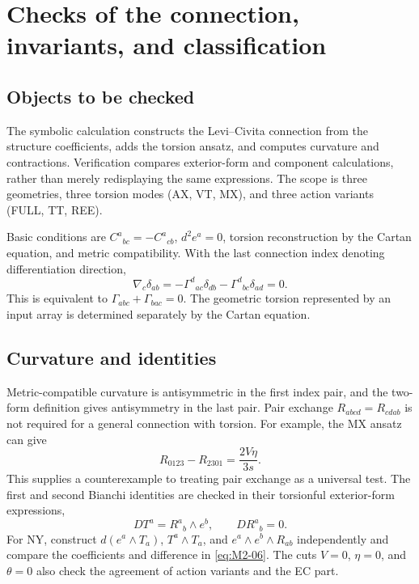 \section{Checks of the connection, invariants, and classification}\label{appB}
\subsection{Objects to be checked}
The symbolic calculation constructs the Levi--Civita connection from the
structure coefficients, adds the torsion ansatz, and computes curvature
and contractions. Verification compares exterior-form and component
calculations, rather than merely redisplaying the same expressions.
The scope is three geometries, three torsion modes (AX, VT, MX),
and three action variants (FULL, TT, REE).

Basic conditions are $C^a{}_{bc}=-C^a{}_{cb}$, $d^2e^a=0$,
torsion reconstruction by the Cartan equation, and metric compatibility.
With the last connection index denoting differentiation direction,
\begin{equation}
\nabla_c\delta_{ab}
=-\Gamma^d{}_{ac}\delta_{db}
-\Gamma^d{}_{bc}\delta_{ad}=0.
\tag{B-01}\label{eq:B-01}
\end{equation}
This is equivalent to $\Gamma_{abc}+\Gamma_{bac}=0$.
The geometric torsion represented by an input array is determined
separately by the Cartan equation.

\subsection{Curvature and identities}
Metric-compatible curvature is antisymmetric in the first index pair,
and the two-form definition gives antisymmetry in the last pair.
Pair exchange $R_{abcd}=R_{cdab}$ is not required for a general
connection with torsion. For example, the MX ansatz can give
\begin{equation}
R_{0123}-R_{2301}=\frac{2V\eta}{3s}.
\tag{B-02}\label{eq:B-02}
\end{equation}
This supplies a counterexample to treating pair exchange as a universal
test. The first and second Bianchi identities are checked in their
torsionful exterior-form expressions,
\begin{equation}
DT^a=R^a{}_b\wedge e^b,\qquad DR^a{}_b=0.
\tag{B-03}\label{eq:B-03}
\end{equation}
For NY, construct $d(e^a\wedge T_a)$, $T^a\wedge T_a$, and
$e^a\wedge e^b\wedge R_{ab}$ independently and compare the coefficients
and difference in \eqref{eq:M2-06}.
The cuts $V=0$, $\eta=0$, and $\theta=0$ also check the agreement of
action variants and the EC part.

